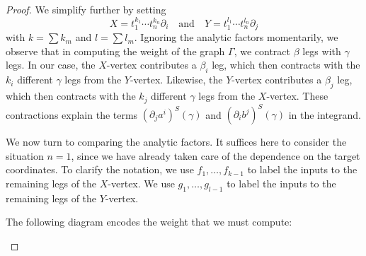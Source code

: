 \begin{proof}
We simplify further by setting
\[
X = t_1^{k_1} \cdots t_n^{k_n} \partial_i \quad\text{and}\quad Y = t_1^{l_1} \cdots t_n^{l_n} \partial_j
\]
with $k =\sum k_m$ and $l = \sum l_m$.
Ignoring the analytic factors momentarily, 
we observe that in computing the weight of the graph $\Gamma$,
we contract $\beta$ legs with $\gamma$ legs.
In our case, the $X$-vertex contributes a $\beta_i$ leg,
which then contracts with the $k_i$ different $\gamma$ legs from the $Y$-vertex.
Likewise, the $Y$-vertex contributes a $\beta_j$ leg,
which then contracts with the $k_j$ different $\gamma$ legs from the $X$-vertex.
These contractions explain the terms $(\partial_j a^i)^S(\gamma)$ and $(\partial_i b^j)^S(\gamma)$ in the integrand.

We now turn to comparing the analytic factors. It suffices here to consider the situation $n =1$,
since we have already taken care of the dependence on the target coordinates.
To clarify the notation, we use $f_1, \ldots, f_{k-1}$ to label the inputs to the remaining legs of the $X$-vertex.
We use $g_1,\ldots, g_{l-1}$ to label the inputs to the remaining legs of the $Y$-vertex.

The following diagram encodes the weight that we must compute:
\begin{center}
\end{center}
\end{proof}
